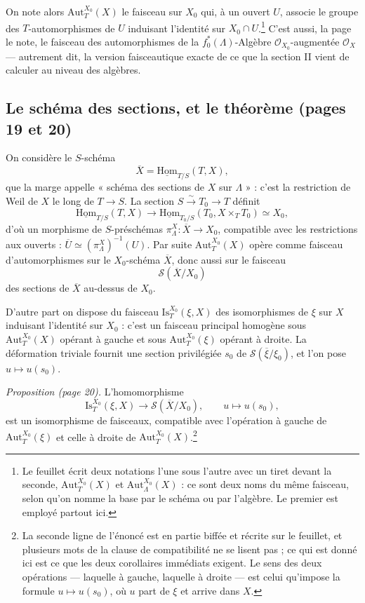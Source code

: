 \documentclass[11pt,a4paper]{article}
\begin{document}
On note alors $\mathrm{Aut}^{X_0}_{T}(X)$ le faisceau sur $X_0$ qui, à un ouvert
$U$, associe le groupe des $T$-automorphismes de $U$ induisant l'identité sur
$X_{0} \cap U$.\footnote{Le feuillet écrit deux notations l'une sous l'autre
avec un tiret devant la seconde, $\mathrm{Aut}^{X_0}_{T}(X)$ et
$\mathrm{Aut}^{X_0}_{\Lambda}(X)$ : ce sont deux noms du même faisceau, selon
qu'on nomme la base par le schéma ou par l'algèbre. Le premier est employé
partout ici.} C'est aussi, la page le note, le faisceau des automorphismes de la
$f_{0}^{*}(\Lambda)$-Algèbre $\mathcal{O}_{X_0}$-augmentée $\mathcal{O}_{X}$ —
autrement dit, la version faisceautique exacte de ce que la section II vient de
calculer au niveau des algèbres.

\subsection*{Le schéma des sections, et le théorème (pages 19 et 20)}

On considère le $S$-schéma
\[
  \overline{X} = \underline{\mathrm{Hom}}_{T/S}(T, X) ,
\]
que la marge appelle « schéma des sections de $X$ sur $\Lambda$ » : c'est la
restriction de Weil de $X$ le long de $T \to S$. La section $S
\xrightarrow{\sim} T_{0} \to T$ définit
\[
  \underline{\mathrm{Hom}}_{T/S}(T, X) \longrightarrow
  \underline{\mathrm{Hom}}_{T_0/S}(T_{0}, X \times_{T} T_{0}) \simeq X_{0} ,
\]
d'où un morphisme de $S$-préschémas $\pi^{X}_{\Lambda} : \overline{X} \to
X_{0}$, compatible avec les restrictions aux ouverts : $\overline{U} \simeq
(\pi^{X}_{\Lambda})^{-1}(U)$. Par suite $\mathrm{Aut}^{X_0}_{T}(X)$ opère comme
faisceau d'automorphismes sur le $X_0$-schéma $\overline{X}$, donc aussi sur le
faisceau
\[
  \mathcal{S}(\overline{X}/X_{0})
\]
des sections de $\overline{X}$ au-dessus de $X_{0}$.

D'autre part on dispose du faisceau $\mathrm{Is}^{X_0}_{T}(\xi, X)$ des
isomorphismes de $\xi$ sur $X$ induisant l'identité sur $X_0$ : c'est un
faisceau principal homogène sous $\mathrm{Aut}^{X_0}_{T}(X)$ opérant à gauche et
sous $\mathrm{Aut}^{X_0}_{T}(\xi)$ opérant à droite. La déformation triviale
fournit une section privilégiée $s_{0}$ de
$\mathcal{S}(\overline{\xi}/\xi_{0})$, et l'on pose $u \mapsto u(s_{0})$.

\emph{Proposition (page 20).} L'homomorphisme
\[
  \mathrm{Is}^{X_0}_{T}(\xi, X) \longrightarrow
  \mathcal{S}(\overline{X}/X_{0}) , \qquad u \longmapsto u(s_{0}) ,
\]
est un isomorphisme de faisceaux, compatible avec l'opération à gauche de
$\mathrm{Aut}^{X_0}_{T}(\xi)$ et celle à droite de
$\mathrm{Aut}^{X_0}_{T}(X)$.\footnote{La seconde ligne de l'énoncé est en
partie biffée et récrite sur le feuillet, et plusieurs mots de la clause de
compatibilité ne se lisent pas ; ce qui est donné ici est ce que les deux
corollaires immédiats exigent. Le sens des deux opérations — laquelle à gauche,
laquelle à droite — est celui qu'impose la formule $u \mapsto u(s_0)$, où $u$
part de $\xi$ et arrive dans $X$.}
\end{document}
